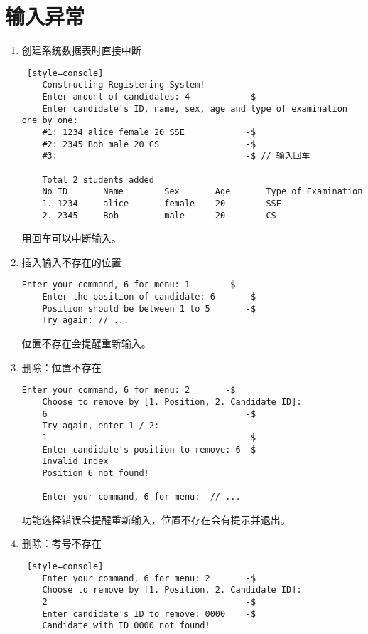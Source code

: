 \vspace*{3cm}

\section{输入异常}

\begin{enumerate}
    \item 创建系统数据表时直接中断
\begin{lstlisting} [style=console]
    Constructing Registering System!
    Enter amount of candidates: 4           -$
    Enter candidate's ID, name, sex, age and type of examination one by one: 
    #1: 1234 alice female 20 SSE            -$
    #2: 2345 Bob male 20 CS                 -$
    #3:                                     -$ // 输入回车
    
    Total 2 students added
    No ID       Name        Sex       Age       Type of Examination
    1. 1234     alice       female    20        SSE
    2. 2345     Bob         male      20        CS
\end{lstlisting}
    用回车可以中断输入。

    \item 插入输入不存在的位置
\begin{lstlisting}[style=console]
    Enter your command, 6 for menu: 1       -$
    Enter the position of candidate: 6      -$
    Position should be between 1 to 5       -$
    Try again: // ...
\end{lstlisting}
    位置不存在会提醒重新输入。

    \item 删除：位置不存在
\begin{lstlisting}[style=console]
    Enter your command, 6 for menu: 2       -$
    Choose to remove by [1. Position, 2. Candidate ID]: 
    6                                       -$
    Try again, enter 1 / 2: 
    1                                       -$
    Enter candidate's position to remove: 6 -$
    Invalid Index
    Position 6 not found!

    Enter your command, 6 for menu:  // ...
\end{lstlisting}
    功能选择错误会提醒重新输入，位置不存在会有提示并退出。

\item 删除：考号不存在
\begin{lstlisting} [style=console]
    Enter your command, 6 for menu: 2       -$
    Choose to remove by [1. Position, 2. Candidate ID]: 
    2                                       -$
    Enter candidate's ID to remove: 0000    -$
    Candidate with ID 0000 not found!


\end{lstlisting}
\end{enumerate}
